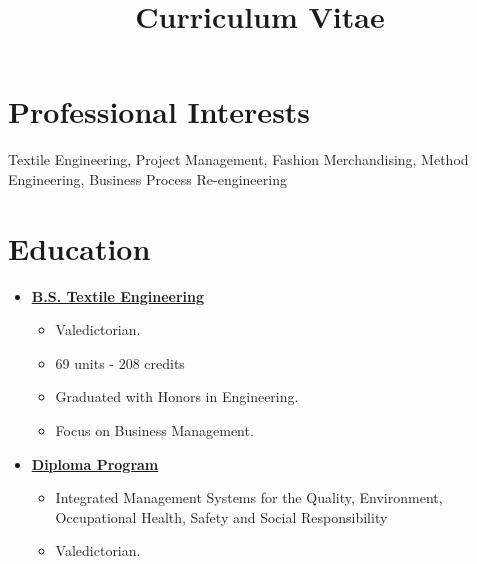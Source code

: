 \documentclass[11pt,a4paper,sans]{moderncv} %
\title{Curriculum Vitae}
\begin{document}
\makecvtitle %

\section{Professional Interests}
%
Textile Engineering, Project Management, Fashion Merchandising, Method Engineering, Business Process Re-engineering  

\section{Education}

\begin{itemize}
\item[] \href{http://fiqt.uni.edu.pe/home/index.php/escuelas-profesionales/ingenieria-textil}{\textbf{B.S. Textile Engineering}} 
        \begin{itemize}
        \item Valedictorian.
        \item 69 units - 208 credits
        \item Graduated with Honors in Engineering.
        \item Focus on Business Management.\\
        \end{itemize}
\end{itemize}

\begin{itemize}
\item[] \href{http://www.cip.org.pe}{\textbf{Diploma Program}}
        \begin{itemize}
        	\item {Integrated Management Systems for the Quality, Environment, Occupational Health, Safety and Social Responsibility}
        	\item Valedictorian.
        \end{itemize}
\end{itemize}
\end{document}
